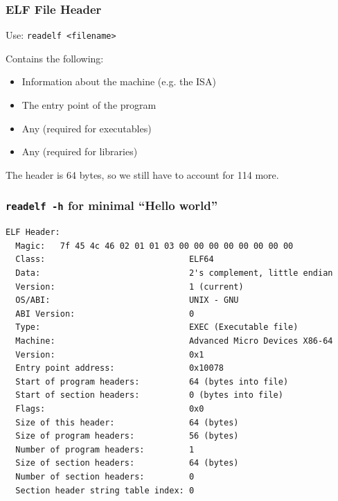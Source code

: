 \documentclass[aspectratio=169]{beamer}
\begin{document}
  \begin{frame}
    \frametitle{ELF File Header}

    Use: \hspace{0.5em} \texttt{readelf <filename>}

    \vspace{1em}

    Contains the following:
    \begin{itemize}
      \item Information about the machine (e.g. the ISA)
      \item The entry point of the program
      \item Any  (required for executables)
      \item Any  (required for libraries)
    \end{itemize}

    \vspace{2em}

    The header is 64 bytes, so we still have to account for 114 more.
  \end{frame}

  \begin{frame}[fragile]
    \frametitle{\texttt{readelf -h} for minimal ``Hello world''}

    \begin{lstlisting}[basicstyle=\scriptsize\ttfamily]
ELF Header:
  Magic:   7f 45 4c 46 02 01 01 03 00 00 00 00 00 00 00 00 
  Class:                             ELF64
  Data:                              2's complement, little endian
  Version:                           1 (current)
  OS/ABI:                            UNIX - GNU
  ABI Version:                       0
  Type:                              EXEC (Executable file)
  Machine:                           Advanced Micro Devices X86-64
  Version:                           0x1
  Entry point address:               0x10078
  Start of program headers:          64 (bytes into file)
  Start of section headers:          0 (bytes into file)
  Flags:                             0x0
  Size of this header:               64 (bytes)
  Size of program headers:           56 (bytes)
  Number of program headers:         1
  Size of section headers:           64 (bytes)
  Number of section headers:         0
  Section header string table index: 0
    \end{lstlisting}
  \end{frame}
\end{document}

